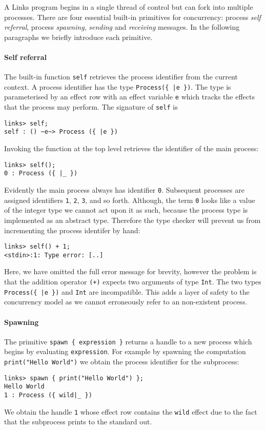 \documentclass[12pt,mscres,cdtppar,twoside,openright,logo,rightchapter,normalheadings]{infthesis}
\theoremstyle{definition}
\begin{document}
A Links program begins in a single thread of control but can fork into
multiple processes. There are four essential built-in primitives for
concurrency: process \emph{self referral}, process \emph{spawning},
\emph{sending} and \emph{receiving} messages. In the following
paragraphs we briefly introduce each primitive.

\paragraph{Self referral} The built-in function \lstinline$self$
retrieves the process identifier from the current context. A process
identifier has the type \lstinline$Process({ |e })$. The type is
parameterised by an effect row with an effect variable \lstinline$e$
which tracks the effects that the process may perform. The signature
of \lstinline$self$ is
\begin{lstlisting}
links> self;
self : () ~e~> Process ({ |e })
\end{lstlisting}
%
Invoking the function at the top level retrieves the identifier of the
main process:
%
\begin{lstlisting}
links> self();
0 : Process ({ |_ })
\end{lstlisting}
%
Evidently the main process always has identifier
\lstinline$0$. Subsequent processes are assigned identifiers
\lstinline$1$, \lstinline$2$, \lstinline$3$, and so forth. Although, the term
\lstinline$0$ looks like a value of the integer type we cannot act
upon it as such, because the process type is implemented as an
abstract type. Therefore the type checker will prevent us from
incrementing the process identifer by hand:
%
\begin{lstlisting}
links> self() + 1;
<stdin>:1: Type error: [..]
\end{lstlisting}
%
Here, we have omitted the full error message for brevity, however the
problem is that the addition operator \lstinline$(+)$ expects two
arguments of type \lstinline$Int$. The two types
\lstinline$Process({ |e })$ and \lstinline$Int$ are incompatible. This
adds a layer of safety to the concurrency model as we cannot
erroneously refer to an non-existent process.
%

\paragraph{Spawning} The primitive \lstinline$spawn { expression }$
returns a handle to a new process which begins by evaluating
\lstinline$expression$. For example by spawning the computation
\lstinline$print("Hello World")$ we obtain the process identifier for the subprocess:
%
\begin{lstlisting}
links> spawn { print("Hello World") };
Hello World
1 : Process ({ wild|_ })
\end{lstlisting}
%
We obtain the handle \lstinline$1$ whose effect row contains the
\lstinline$wild$ effect due to the fact that the subprocess prints to
the standard out.
\end{document}
